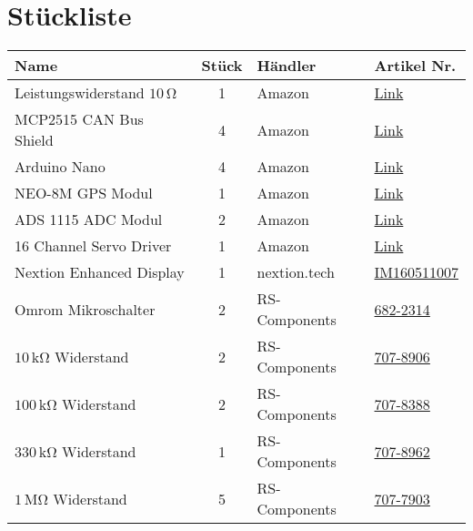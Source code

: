 \section{Stückliste}
\begin{table}[h]
    \centering
    \begin{threeparttable}
    \begin{tabular}{|l|c|M{3cm}|l|}
        \hline
    Name                         & Stück & Händler & Artikel Nr. \\\hline
    Leistungswiderstand $10\,\mathrm{\Omega}$ & 1 & Amazon & \href{https://www.amazon.de/-/en/sourcing-Aluminum-Housing-Mounted-Resistor/dp/B07H25VYM4/}{Link}\\
    MCP2515 CAN Bus Shield & 4 & Amazon & \href{https://www.amazon.de/-/en/AZDelivery-MCP2515-Shield-compatible-Arduino/dp/B086V3HLQ4}{Link}\\
    Arduino Nano           & 4 & Amazon & \href{https://www.amazon.de/gp/product/B078SBBST6}{Link}\\
    NEO-8M GPS Modul & 1 & Amazon & \href{https://www.amazon.de/-/en/gp/product/B07SQJ7Q6X}{Link}\\
    ADS 1115 ADC Modul & 2 & Amazon & \href{https://www.amazon.de/AZDelivery-ADS1115-Channels-Arduino-Raspberry/dp/B07QHWLTTS}{Link}\\
    16 Channel Servo Driver & 1 & Amazon & \href{https://www.amazon.de/Allrounder-PCA9685-Sunflower-16-Channel-Arduino-Raspberry/dp/B014KTSMLA}{Link}\\\hline
    Nextion Enhanced Display & 1 & nextion.tech & \href{https://www.itead.cc/nextion-nx8048k050.html}{IM160511007}\\\hline
    Omrom Mikroschalter & 2 & RS-Components & \href{https://at.rs-online.com/web/p/detektorschalter/6822314/}{682-2314}\\
    $10\,\mathrm{k\Omega}$ Widerstand & 2 & RS-Components &\href{https://at.rs-online.com/web/p/widerstande-durchsteckmontage/7078906/}{707-8906}\\
    $100\,\mathrm{k\Omega}$ Widerstand & 2 & RS-Components &\href{https://at.rs-online.com/web/p/widerstande-durchsteckmontage/7078388/}{707-8388}\\
    $330\,\mathrm{k\Omega}$ Widerstand & 1 & RS-Components &\href{https://at.rs-online.com/web/p/widerstande-durchsteckmontage/7078962/}{707-8962}\\
    $1\,\mathrm{M\Omega}$ Widerstand & 5 & RS-Components &\href{https://at.rs-online.com/web/p/widerstande-durchsteckmontage/7077903/}{707-7903}\\

\end{tabular}
\end{threeparttable}
\end{table}
